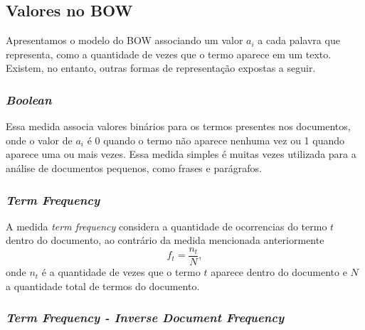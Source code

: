 \subsection{Valores no BOW}
\label{sec:representação_dos_termos}

Apresentamos o modelo do BOW associando um valor \(a_i\) a cada palavra que representa, como a quantidade de vezes que o termo aparece em um texto. Existem, no entanto, outras formas de representação expostas a seguir.

\subsubsection{\textit{Boolean}}
\label{ssub:bag-boolean}

Essa medida associa valores binários para os termos presentes nos documentos, onde o valor de \(a_{i}\) é 0 quando o termo não aparece nenhuma vez ou 1 quando aparece uma ou mais vezes. Essa medida simples é muitas vezes utilizada para a análise de documentos pequenos, como frases e parágrafos.

\subsubsection{\textit{Term Frequency}}
\label{ssub:baf-tf}

A medida \textit{term frequency} considera a quantidade de ocorrencias do termo \(t\) dentro do documento, ao contrário da medida mencionada anteriormente \cite{buckley1988}
%
\begin{equation}
f_t=\frac{n_t}{N},
\end{equation}
%
onde \(n_t\) é a quantidade de vezes que o termo \(t\) aparece dentro do documento e \(N\) a quantidade total de termos do documento.

\subsubsection{\textit{Term Frequency - Inverse Document Frequency}}
\label{ssub:baf-tfidf}

